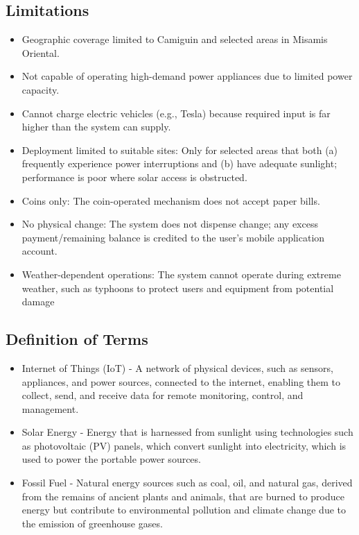 {\subsection{Limitations}
	\begin{itemize}
		\item  Geographic coverage limited to Camiguin and selected areas in Misamis Oriental.
		\item  Not capable of operating high-demand power appliances due to limited power capacity.
		\item Cannot charge electric vehicles (e.g., Tesla) because required input is far higher than the system can supply.
		\item Deployment limited to suitable sites: Only for selected areas that both (a) frequently experience power interruptions and (b) have adequate sunlight; performance is poor where solar access is obstructed.
		\item Coins only: The coin-operated mechanism does not accept paper bills.
		\item No physical change: The system does not dispense change; any excess payment/remaining balance is credited to the user’s mobile application account.
		\item Weather-dependent operations: The system cannot operate during extreme weather, such as typhoons to protect users and equipment from potential damage
	\end{itemize}

\subsection{Definition of Terms}


\begin{itemize}
	\item Internet of Things (IoT) - A network of physical devices, such as sensors, appliances, and power sources, connected to the internet, enabling them to collect, send, and receive data for remote monitoring, control, and management.
	
	\item Solar Energy - Energy that is harnessed from sunlight using technologies such as photovoltaic (PV) panels, which convert sunlight into electricity, which is used to power the portable power sources.
	
	\item Fossil Fuel - Natural energy sources such as coal, oil, and natural gas, derived from the remains of ancient plants and animals, that are burned to produce energy but contribute to environmental pollution and climate change due to the emission of greenhouse gases.
	

\end{itemize}}
